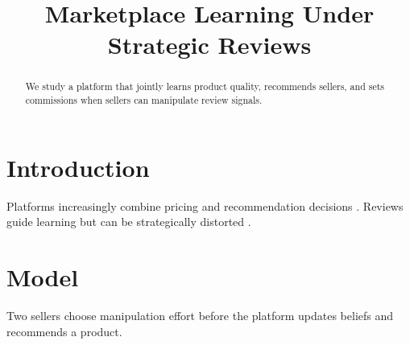 \documentclass{article}
\title{Marketplace Learning Under Strategic Reviews}
\begin{document}
\maketitle
\begin{abstract}
We study a platform that jointly learns product quality, recommends sellers, and sets commissions when sellers can manipulate review signals.
\end{abstract}
\section{Introduction}
Platforms increasingly combine pricing and recommendation decisions \citep{cao2026learning}. Reviews guide learning but can be strategically distorted \citep{luca2016fake}.
\section{Model}
Two sellers choose manipulation effort before the platform updates beliefs and recommends a product.


\end{document}
